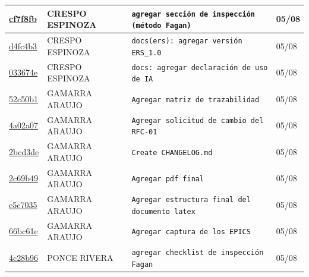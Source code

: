 \documentclass[11pt,a4paper]{article}
\begin{document}
\begin{longtable}{|p{1.9cm}|p{2.4cm}|p{7.6cm}|p{1.3cm}|}
\href{https://github.com/EdhuXav/EdhuXav-ISR401-PFC-ERS-EquipoJ/commit/cf7f8fb4cffa103dfe9021babe85d680bb348acf}{cf7f8fb}
& CRESPO ESPINOZA & \texttt{agregar sección de inspección (método Fagan)} & 05/08 \\ \hline

\href{https://github.com/EdhuXav/EdhuXav-ISR401-PFC-ERS-EquipoJ/commit/d4fc4b342603e100db30a2d061a5cf3d0697d44a}{d4fc4b3}
& CRESPO ESPINOZA & \texttt{docs(ers): agregar versión ERS\_1.0} & 05/08 \\ \hline

\href{https://github.com/EdhuXav/EdhuXav-ISR401-PFC-ERS-EquipoJ/commit/033674ed6cb0022ceb97a80646d9a6a74e60b5b2}{033674e}
& CRESPO ESPINOZA & \texttt{docs: agregar declaración de uso de IA} & 05/08 \\ \hline

\href{https://github.com/EdhuXav/EdhuXav-ISR401-PFC-ERS-EquipoJ/commit/52c50b1cb7b9311c92c1c3f8c488f2a815137182}{52c50b1}
& GAMARRA ARAUJO & \texttt{Agregar matriz de trazabilidad} & 05/08 \\ \hline

\href{https://github.com/EdhuXav/EdhuXav-ISR401-PFC-ERS-EquipoJ/commit/4a02a07ad940466e04b02dee30a2f0c6d4eedbd9}{4a02a07}
& GAMARRA ARAUJO & \texttt{Agregar solicitud de cambio del RFC-01} & 05/08 \\ \hline

\href{https://github.com/EdhuXav/EdhuXav-ISR401-PFC-ERS-EquipoJ/commit/2bcd3de83b6d4069696b06032c04473ecee37868}{2bcd3de}
& GAMARRA ARAUJO & \texttt{Create CHANGELOG.md} & 05/08 \\ \hline

\href{https://github.com/EdhuXav/EdhuXav-ISR401-PFC-ERS-EquipoJ/commit/2c69b4979f1d7615f1368bb5b31ea9e7cbca1bbd}{2c69b49}
& GAMARRA ARAUJO & \texttt{Agregar pdf final} & 05/08 \\ \hline

\href{https://github.com/EdhuXav/EdhuXav-ISR401-PFC-ERS-EquipoJ/commit/e5c7035c01787ea988a2c1a5ddfdeb4a77810441}{e5c7035}
& GAMARRA ARAUJO & \texttt{Agregar estructura final del documento latex} & 05/08 \\ \hline

\href{https://github.com/EdhuXav/EdhuXav-ISR401-PFC-ERS-EquipoJ/commit/66bc61e064c4d171032de0745327d9571e574e42}{66bc61e}
& GAMARRA ARAUJO & \texttt{Agregar captura de los EPICS} & 05/08 \\ \hline

\href{https://github.com/EdhuXav/EdhuXav-ISR401-PFC-ERS-EquipoJ/commit/4c28b9678b00f38a03b3de04668b2bf80a98c770}{4c28b96}
& PONCE RIVERA & \texttt{agregar checklist de inspección Fagan} & 05/08 \\ \hline


\end{longtable}
\end{document}
